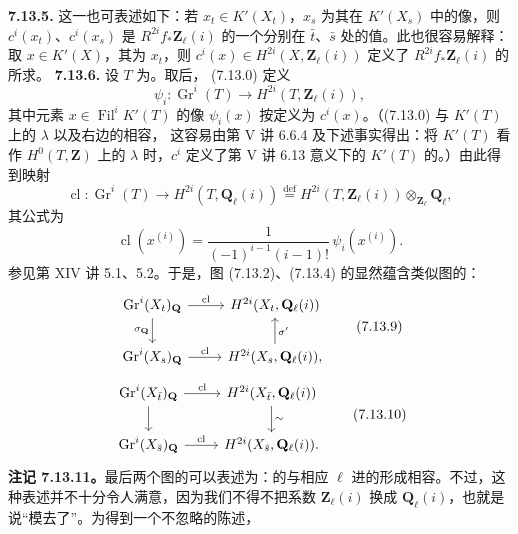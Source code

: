 \textbf{7.13.5.} 这一也可表述如下：若 $x_t\in K'(X_t)$，$x_s$ 为其在 $K'(X_s)$ 中的像，则 $c^i(x_t)$、$c^i(x_s)$ 是 $R^{2i}f_*\mathbf Z_\ell(i)$ 的一个分别在 $\bar t$、$\bar s$ 处的值。此也很容易解释：取 $x\in K'(X)$，其为 $x_t$，则 $c^i(x)\in H^{2i}(X,\mathbf Z_\ell(i))$ 定义了 $R^{2i}f_*\mathbf Z_\ell(i)$ 的所求。
\textbf{7.13.6.} 设 $T$ 为。取后， (7.13.0) 定义
\[\psi_i:\operatorname{Gr}^i(T)\longrightarrow H^{2i}(T,\mathbf Z_\ell(i)),\]
其中元素 $x\in\operatorname{Fil}^iK'(T)$ 的像 $\psi_i(x)$ 按定义为 $c^i(x)$。（(7.13.0) 与 $K'(T)$ 上的 $\lambda$ 以及右边的相容，
这容易由第 V 讲 6.6.4 及下述事实得出：将 $K'(T)$ 看作 $H^0(T,\mathbf Z)$ 上的 $\lambda$ 时，$c^i$ 定义了第 V 讲 6.13 意义下的 $K'(T)$ 的。）由此得到映射
\[\operatorname{cl}:\operatorname{Gr}^i(T)\longrightarrow H^{2i}(T,\mathbf Q_\ell(i))\overset{\mathrm{def}}=H^{2i}(T,\mathbf Z_\ell(i))\otimes_{\mathbf Z_\ell}\mathbf Q_\ell,\tag{7.13.7}\]
其公式为
\[\operatorname{cl}(x^{(i)})=\frac{1}{(-1)^{i-1}(i-1)!}\,\psi_i(x^{(i)}).\tag{7.13.8}\]
参见第 XIV 讲 5.1、5.2。于是，图 (7.13.2)、(7.13.4) 的显然蕴含类似图的：
\[\begin{tikzcd}\operatorname{Gr}^i(X_t)_{\mathbf Q}\arrow[r,"\operatorname{cl}"]\arrow[d,"\sigma_{\mathbf Q}"']&H^{2i}(X_t,\mathbf Q_\ell(i))\\\operatorname{Gr}^i(X_s)_{\mathbf Q}\arrow[r,"\operatorname{cl}"]&H^{2i}(X_s,\mathbf Q_\ell(i))\arrow[u,"\sigma'"'] ,\end{tikzcd}\tag{7.13.9}\]
\[\begin{tikzcd}\operatorname{Gr}^i(X_{\bar t})_{\mathbf Q}\arrow[r,"\operatorname{cl}"]\arrow[d]&H^{2i}(X_{\bar t},\mathbf Q_\ell(i))\arrow[d,"\sim"]\\\operatorname{Gr}^i(X_{\bar s})_{\mathbf Q}\arrow[r,"\operatorname{cl}"]&H^{2i}(X_{\bar s},\mathbf Q_\ell(i)).\end{tikzcd}\tag{7.13.10}\]
\textbf{注记 7.13.11。}最后两个图的可以表述为：的与相应 $\ell$ 进的形成相容。不过，这种表述并不十分令人满意，因为我们不得不把系数 $\mathbf Z_\ell(i)$ 换成 $\mathbf Q_\ell(i)$，也就是说“模去了”。为得到一个不忽略的陈述，
